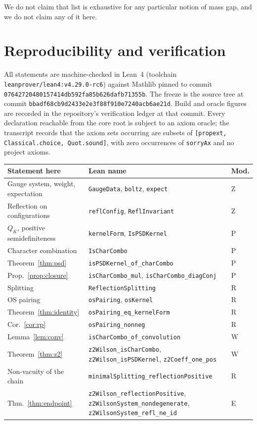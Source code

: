 \documentclass[11pt]{article}
\theoremstyle{definition}
\newcommand{\lean}[1]{\texttt{#1}}
\newcommand{\anchor}{bbadf68cb9d2433e2e3f88f910e7240acb6ae21d}
\begin{document}
We do not claim that list is exhaustive for any particular notion of mass gap,
and we do not claim any of it here.

\section{Reproducibility and verification}

All statements are machine-checked in Lean~4 (toolchain
\lean{leanprover/lean4:v4.29.0-rc6}) against Mathlib pinned to commit
\lean{07642720480157414db592fa85b626dafb71355b}.  The freeze is the source tree
at commit \lean{\anchor}.  Build and oracle figures are recorded in the
repository's verification ledger at that commit.  Every declaration reachable
from the core root is subject to an axiom oracle; the transcript records that
the axiom sets occurring are subsets of
\lean{[propext, Classical.choice, Quot.sound]}, with zero occurrences of
\lean{sorryAx} and no project axioms.

\small
\begin{longtable}{@{}>{\raggedright\arraybackslash}p{} >{\raggedright\arraybackslash}p{} l@{}}
\toprule
Statement here & Lean name & Mod. \\
\midrule
\endhead
Gauge system, weight, expectation & \lean{GaugeData}, \lean{boltz},
  \lean{expect} & Z \\
Reflection on configurations & \lean{reflConfig}, \lean{ReflInvariant} & Z \\
$Q_K$, positive semidefiniteness & \lean{kernelForm}, \lean{IsPSDKernel} & P \\
Character combination & \lean{IsCharCombo} & P \\
Theorem~\ref{thm:psd} & \lean{isPSDKernel\_of\_charCombo} & P \\
Prop.~\ref{prop:closure} & \lean{isCharCombo\_mul},
  \lean{isCharCombo\_diagConj} & P \\
Splitting & \lean{ReflectionSplitting} & R \\
OS pairing & \lean{osPairing}, \lean{osKernel} & R \\
Theorem~\ref{thm:identity} & \lean{osPairing\_eq\_kernelForm} & R \\
Cor.~\ref{cor:rp} & \lean{osPairing\_nonneg} & R \\
Lemma~\ref{lem:conv} & \lean{isCharCombo\_of\_convolution} & W \\
Theorem~\ref{thm:z2} & \lean{z2Wilson\_isCharCombo},
  \lean{z2Wilson\_isPSDKernel}, \lean{z2Coeff\_one\_pos} & W \\
Non-vacuity of the chain & \lean{minimalSplitting\_reflectionPositive} & R \\
Thm.~\ref{thm:endpoint} & \lean{z2Wilson\_reflectionPositive},
  \lean{z2WilsonSystem\_nondegenerate}, \lean{z2WilsonSystem\_refl\_ne\_id} & E \\
\bottomrule
\end{longtable}
\normalsize
\end{document}
